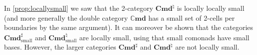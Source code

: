 \documentclass[11pt, oneside, article]{memoir}
\theoremstyle{plain}
\theoremstyle{definition}
\theoremstyle{remark}
\newenvironment{counterexample}
{\renewcommand\qedsymbol{$\lrcorner$}%
  \pushQED{\qed}\mycounterexample}
{\popQED\endmycounterexample}
\newcommand{\namedcat}[1]{\mathbf{#1}}
\newcommand{\Set}{\namedcat{Set}}
\newcommand{\Cmd}{\mathbb{C}\namedcat{md}}
\newcommand{\CmdSet}{\Cmd}
\newcommand{\Com}{\namedcat{Cmd}^\sharp}
\newcommand{\ComSet}{\Com}
\newcommand{\Con}{\namedcat{Cmd}^\natural}
\newcommand{\ConSet}{\Con}
\newcommand{\point}{\mathbf{1}}
\newcommand{\AccCom}{\Com_{\mathrm{small}}}
\newcommand{\AccCon}{\Con_{\mathrm{small}}}
\newcommand{\AccComSet}{\AccCom}
\newcommand{\AccConSet}{\AccCon}
\newcommand{\xX}{X}
\begin{document}


In \cref{prop:locallysmall} we saw that the 2-category $\ConSet$ is
locally locally small (and more generally the double category
$\CmdSet$ has a small set of 2-cells per boundaries by the same
argument). It can moreover be shown that the categories $\AccComSet$
and $\AccConSet$ are locally small, using that small comonads have
small bases. However, the larger categories $\ComSet$ and $\ConSet$
are not locally small.
\end{document}
